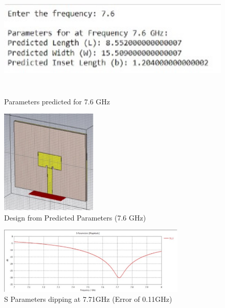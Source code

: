 \documentclass[a4paper,12pt]{report}
\begin{document}
\begin{figure}[H]
    \centering
    \begin{minipage}{0.48\textwidth}
        \centering
        \includegraphics[width=\textwidth,height =5cm]{data76.png}
        \caption{Parameters predicted for 7.6 GHz}
        \label{fig:4ghz_inset1}
    \end{minipage}
    \hfill %
    \begin{minipage}{0.48\textwidth}
        \centering
        \includegraphics[width=\textwidth,height =5cm]{pred76img.png}
        \caption{Design from Predicted Parameters (7.6 GHz)}
        \label{fig:4ghz_inset2}
    \end{minipage}
\end{figure}
\begin{figure}[H]
    \centering
    \includegraphics[width=0.8\textwidth]{pred76.jpg}
    \caption{S Parameters dipping at 7.71GHz (Error of 0.11GHz)}
    \label{fig:width_calculator}
\end{figure}
\end{document}
